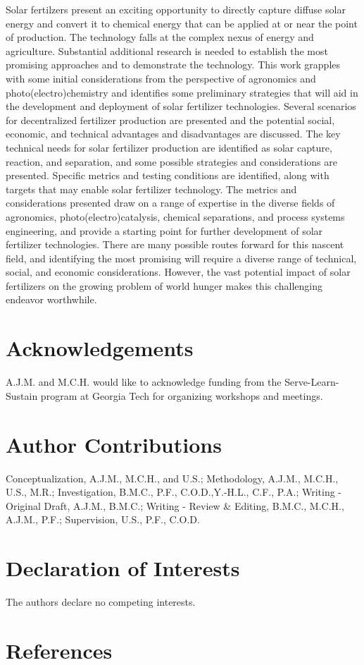 Solar fertilzers present an exciting opportunity to directly capture diffuse solar energy and convert it to chemical energy that can be applied at or near the point of production. The technology falls at the complex nexus of energy and agriculture. Substantial additional research is needed to establish the most promising approaches and to demonstrate the technology. This work grapples with some initial considerations from the perspective of agronomics and photo(electro)chemistry and identifies some preliminary strategies that will aid in the development and deployment of solar fertilizer technologies. Several scenarios for decentralized fertilizer production are presented and the potential social, economic, and technical advantages and disadvantages are discussed. The key technical needs for solar fertilizer production are identified as solar capture, reaction, and separation, and some possible strategies and considerations are presented. Specific metrics and testing conditions are identified, along with targets that may enable solar fertilizer technology. The metrics and considerations presented draw on a range of expertise in the diverse fields of agronomics, photo(electro)catalysis, chemical separations, and process systems engineering, and provide a starting point for further development of solar fertilizer technologies. There are many possible routes forward for this nascent field, and identifying the most promising will require a diverse range of technical, social, and economic considerations. However, the vast potential impact of solar fertilizers on the growing problem of world hunger makes this challenging endeavor worthwhile.

\section*{Acknowledgements}
A.J.M. and M.C.H. would like to acknowledge funding from the Serve-Learn-Sustain program at Georgia Tech for organizing workshops and meetings.

\section*{Author Contributions}
Conceptualization, A.J.M., M.C.H., and U.S.; Methodology, A.J.M., M.C.H., U.S., M.R.; Investigation, B.M.C., P.F., C.O.D.,Y.-H.L., C.F., P.A.; Writing - Original Draft, A.J.M., B.M.C.; Writing - Review \& Editing, B.M.C., M.C.H., A.J.M., P.F.; Supervision, U.S., P.F., C.O.D. 

\section*{Declaration of Interests}
The authors declare no competing interests.

\section*{References}
